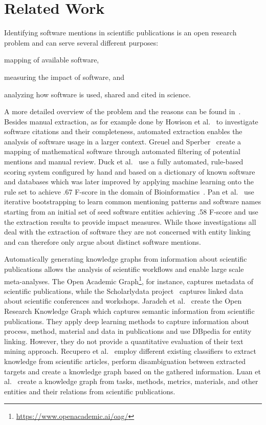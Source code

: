 \documentclass[runningheads]{llncs}
\begin{document}
\section{Related Work}\label{sec:sota}
Identifying software mentions in scientific publications is an open research problem and can serve several different purposes: 
\begin{inparaenum}[1.)]
\item mapping of available software, 
\item measuring the impact of software, and 
\item analyzing how software is used, shared and cited in science. 
\end{inparaenum}
A more detailed overview of the problem and the reasons can be found in~\cite{Krueger2019}.
Besides manual extraction, as for example done by Howison et al.~\cite{howison2016software} to investigate software citations and their completeness, automated extraction enables the analysis of software usage in a larger context. 
Greuel and Sperber~\cite{greuel2014swmath} create a mapping of mathematical software through automated filtering of potential mentions and manual review.
Duck et al.~\cite{duck2013bionerds} use a fully automated, rule-based scoring system configured by hand and based on a dictionary of known software and databases which was later improved by applying machine learning onto the rule set to achieve  .67 F-score in the domain of Bioinformatics~\cite{duck2016survey}. 
Pan et al.~\cite{pan2015assessing} use iterative bootstrapping to learn common mentioning patterns and software names starting from an initial set of seed software entities achieving .58 F-score and use the extraction results to provide impact measures. 
While those investigations all deal with the extraction of software they are not concerned with entity linking and can therefore only argue about distinct software mentions. 

Automatically generating knowledge graphs from information about scientific publications allows the analysis of scientific workflows and enable large scale meta-analyses. 
The Open Academic Graph\footnote{\url{https://www.openacademic.ai/oag/}}, for instance, captures metadata of scientific publications, while the Scholarlydata project~\cite{nuzzolese2016conference} captures linked data about scientific conferences and workshops.
Jaradeh et al.~\cite{jaradeh2019open} create the Open Research Knowledge Graph which captures semantic information from scientific publications. 
They apply deep learning methods to capture information about process, method, material and data in publications and use DBpedia for entity linking. 
However, they do not provide a quantitative evaluation of their text mining approach. 
Recupero et al.~\cite{recupero2019mining} employ different existing classifiers to extract knowledge from scientific articles, perform disambiguation between extracted targets and create a knowledge graph based on the gathered information. 
Luan et al.~\cite{luan2018multitask} create a knowledge graph from tasks, methods, metrics, materials, and other entities and their relations from scientific publications.
\end{document}
